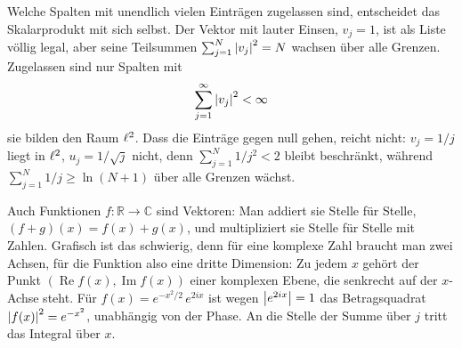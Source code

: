 \begin{webonly}
Welche Spalten mit unendlich vielen Einträgen zugelassen sind, entscheidet das Skalarprodukt mit sich selbst. Der Vektor mit lauter Einsen, $v_j = 1$, ist als Liste völlig legal, aber seine Teilsummen $\sum_{j=1}^{N} \left\lvert v_j \right\rvert^2 = N$ wachsen über alle Grenzen. Zugelassen sind nur Spalten mit
\begin{equation*}
	\sum_{j=1}^{\infty} \left\lvert v_j \right\rvert^2 < \infty
\end{equation*}
sie bilden den Raum $\ell^{2}$. Dass die Einträge gegen null gehen, reicht nicht: $v_j = 1/j$ liegt in $\ell^{2}$, $u_j = 1/\sqrt{j}$ nicht, denn $\sum_{j=1}^{N} 1/j^2 < 2$ bleibt beschränkt, während $\sum_{j=1}^{N} 1/j \geq \ln(N+1)$ über alle Grenzen wächst.
\end{webonly}


\begin{webonly}
Auch Funktionen $f\colon \mathbb{R} \to \mathbb{C}$ sind Vektoren: Man addiert sie Stelle für Stelle, $(f+g)(x) = f(x) + g(x)$, und multipliziert sie Stelle für Stelle mit Zahlen. Grafisch ist das schwierig, denn für eine komplexe Zahl braucht man zwei Achsen, für die Funktion also eine dritte Dimension: Zu jedem $x$ gehört der Punkt $(\operatorname{Re} f(x), \operatorname{Im} f(x))$ einer komplexen Ebene, die senkrecht auf der $x$-Achse steht. Für $f(x) = e^{-x^2/2}\, e^{2ix}$ ist wegen $\left\lvert e^{2ix} \right\rvert = 1$ das Betragsquadrat $\left\lvert f(x) \right\rvert^2 = e^{-x^2}$, unabhängig von der Phase. An die Stelle der Summe über $j$ tritt das Integral über $x$.
\end{webonly}


